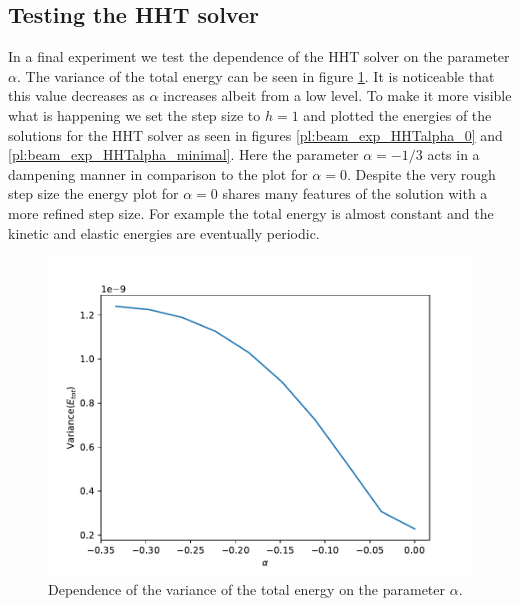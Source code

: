 \documentclass{report}
\newcounter{constant}
\begin{document}
\subsection*{Testing the HHT solver}

In a final experiment we test the dependence of the HHT solver on the parameter $\alpha$. The variance of the total energy can be seen in figure \ref{pl:beam_exp_HHTalpha}. It is noticeable that this value decreases as $\alpha$ increases albeit from a low level. To make it more visible what is happening we set the step size to $h=1$ and plotted the energies of the solutions for the HHT solver as seen in figures \ref{pl:beam_exp_HHTalpha_0} and \ref{pl:beam_exp_HHTalpha_minimal}. Here the parameter $\alpha=-1/3$ acts in a dampening manner in comparison to the plot for $\alpha=0$. Despite the very rough step size the energy plot for $\alpha=0$ shares many features of the solution with a more refined step size. For example the total energy is almost constant and the kinetic and elastic energies are eventually periodic.

\begin{figure}[h]
\centering
\begin{minipage}[t]{0.45\textwidth}
\centering
\includegraphics[width=\textwidth]{../Plots/Project3_main/Figure_920.pdf}
\caption{Dependence of the variance of the total energy on the parameter $\alpha$.}
\label{pl:beam_exp_HHTalpha}
\end{minipage}
\end{figure}
\end{document}
